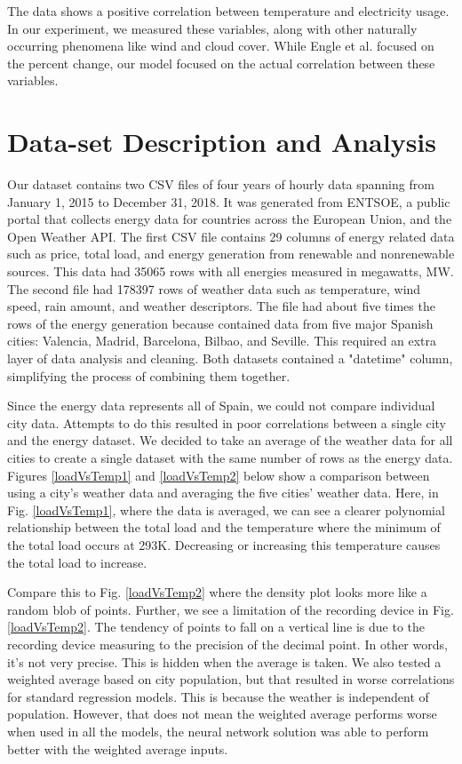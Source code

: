 \documentclass[10pt]{article}
\begin{document}
The data shows a positive correlation between temperature and electricity usage. In our experiment, we measured these variables, along with other naturally occurring phenomena like wind and cloud cover. While Engle et al. focused on the percent change, our model focused on the actual correlation between these variables.


\section{Data-set Description and Analysis}\label{sec:3}
Our dataset contains two CSV files of four years of hourly data spanning from January 1, 2015 to December 31, 2018. It was generated from ENTSOE, a public portal that collects energy data for countries across the European Union, and the Open Weather API. The first CSV file contains 29 columns of energy related data such as price, total load, and energy generation from renewable and nonrenewable sources. This data had 35065 rows with all energies measured in megawatts, MW. The second file had 178397 rows of weather data such as temperature, wind speed, rain amount, and weather descriptors. The file had about five times the rows of the energy generation because contained data from five major Spanish cities: Valencia, Madrid, Barcelona, Bilbao, and Seville. This required an extra layer of data analysis and cleaning. Both datasets contained a "datetime" column, simplifying the process of combining them together.


Since the energy data represents all of Spain, we could not compare individual city data. Attempts to do this resulted in poor correlations between a single city and the energy dataset. We decided to take an average of the weather data for all cities to create a single dataset with the same number of rows as the energy data. Figures \ref{loadVsTemp1} and \ref{loadVsTemp2} below show a comparison between using a city's weather data and averaging the five cities’ weather data. Here, in Fig. \ref{loadVsTemp1}, where the data is averaged, we can see a clearer polynomial relationship between the total load and the temperature where the minimum of the total load occurs at 293K. Decreasing or increasing this temperature causes the total load to increase. 

Compare this to Fig. \ref{loadVsTemp2} where the density plot looks more like a random blob of points. Further, we see a limitation of the recording device in Fig. \ref{loadVsTemp2}. The tendency of points to fall on a vertical line is due to the recording device measuring to the precision of the decimal point. In other words, it's not very precise. This is hidden when the average is taken. We also tested a weighted average based on city population, but that resulted in worse correlations for standard regression models. This is because the weather is independent of population. However, that does not mean the weighted average performs worse when used in all the models, the neural network solution was able to perform better with the weighted average inputs.
\end{document}
